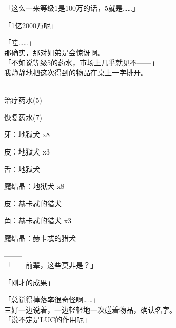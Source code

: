 「这么一来等级1是100万的话，5就是……」

「1亿2000万呢」

「哇……」\\

那确实，那对姐弟是会惊讶啊。\\

「不如说等级5的药水，市场上几乎就见不——」\\

我静静地把这次得到的物品在桌上一字排开。\\

  --------

治疗药水(5)

恢复药水(7)

牙：地狱犬 x8

皮：地狱犬 x3

舌：地狱犬

魔结晶：地狱犬 x8

皮：赫卡忒的猎犬

角：赫卡忒的猎犬 x3

魔结晶：赫卡忒的猎犬

  --------\\

「——前辈，这些莫非是？」

「刚才的成果」

「总觉得掉落率很奇怪啊……」\\

三好一边说着，一边轻轻地一次碰着物品，确认名字。\\

「说不定是LUC的作用呢」\\

